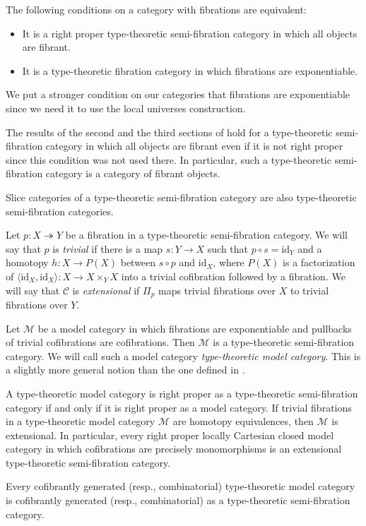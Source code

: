 \documentclass[reqno]{amsart}
\theoremstyle{definition}
\theoremstyle{remark}
\newcommand{\fs}[1]{\mathrm{#1}}
\newcommand{\scat}[1]{\mathcal{#1}}
\newcommand{\id}{\fs{id}}
\numberwithin{figure}{section}
\begin{document}
The following conditions on a category with fibrations are equivalent:
\begin{itemize}
\item It is a right proper type-theoretic semi-fibration category in which all objects are fibrant.
\item It is a type-theoretic fibration category in which fibrations are exponentiable.
\end{itemize}
We put a stronger condition on our categories that fibrations are exponentiable since we need it to use the local universes construction.

\begin{remark}
The results of the second and the third sections of \cite{shul-inv} hold for a type-theoretic semi-fibration category in which all objects are fibrant even if it is not right proper since this condition was not used there.
In particular, such a type-theoretic semi-fibration category is a category of fibrant objects.
\end{remark}

\begin{remark}
Slice categories of a type-theoretic semi-fibration category are also type-theoretic semi-fibration categories.
\end{remark}

Let $p : X \twoheadrightarrow Y$ be a fibration in a type-theoretic semi-fibration category.
We will say that $p$ is \emph{trivial} if there is a map $s : Y \to X$ such that $p \circ s = \id_Y$ and a homotopy $h : X \to P(X)$ between $s \circ p$ and $\id_X$,
where $P(X)$ is a factorization of $\langle \id_X, \id_X \rangle : X \to X \times_Y X$ into a trivial cofibration followed by a fibration.
We will say that $\scat{C}$ is \emph{extensional} if $\Pi_p$ maps trivial fibrations over $X$ to trivial fibrations over $Y$.

\begin{example}
Let $\scat{M}$ be a model category in which fibrations are exponentiable and pullbacks of trivial cofibrations are cofibrations.
Then $\scat{M}$ is a type-theoretic semi-fibration category.
We will call such a model category \emph{type-theoretic model category}.
This is a slightly more general notion than the one defined in \cite[Definition~2.12]{shul-inv}.

A type-theoretic model category is right proper as a type-theoretic semi-fibration category if and only if it is right proper as a model category.
If trivial fibrations in a type-theoretic model category $\scat{M}$ are homotopy equivalences, then $\scat{M}$ is extensional.
In particular, every right proper locally Cartesian closed model category in which cofibrations are precisely monomorphisms is an extensional type-theoretic semi-fibration category.

Every cofibrantly generated (resp., combinatorial) type-theoretic model category is cofibrantly generated (resp., combinatorial) as a type-theoretic semi-fibration category.
\end{example}
\end{document}
